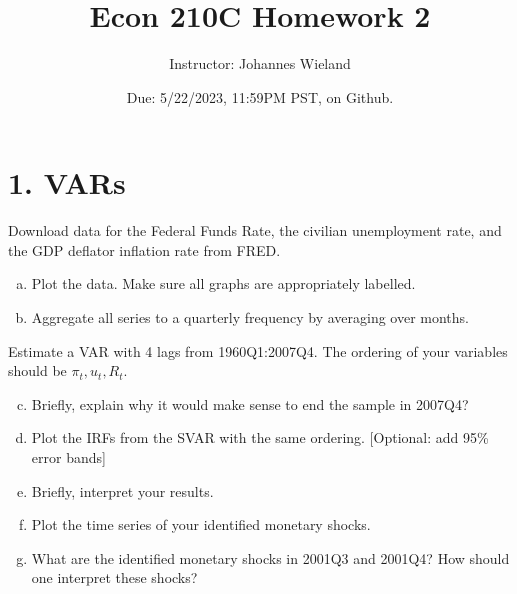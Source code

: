 \documentclass{article}
\newcommand{\1}{\mathbf{1}}
\begin{document}
\title{Econ 210C Homework 2}
\author{Instructor: Johannes Wieland}
\date{\color{red} Due: 5/22/2023, 11:59PM PST, on Github.}
\maketitle



\section*{1. VARs}
Download data for the Federal Funds Rate, the civilian unemployment rate, and the GDP deflator inflation rate from FRED.
\begin{enumerate}[(a)]
	\item Plot the data. Make sure all graphs are appropriately labelled.
	\item Aggregate all series to a quarterly frequency by averaging over months.
\end{enumerate}
Estimate a VAR with 4 lags from 1960Q1:2007Q4. The ordering of your variables should be $\pi_t,u_t,R_t$.
\begin{enumerate}[(a)]\setcounter{enumi}{2}
	\item Briefly, explain why it would make sense to end the sample in 2007Q4?
	\item Plot the IRFs from the SVAR with the same ordering. [Optional: add 95\% error bands]
	\item Briefly, interpret your results.
	\item Plot the time series of your identified monetary shocks.
	\item What are the identified monetary shocks in 2001Q3 and 2001Q4? How should one interpret these shocks?
\end{enumerate}
\end{document}
